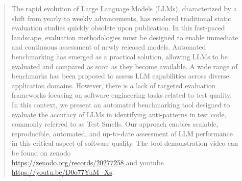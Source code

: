 \documentclass[sigconf]{acmart}
\begin{document}
\begin{abstract}

The rapid evolution of Large Language Models (LLMs), characterized by a shift from yearly to weekly advancements, has rendered traditional static evaluation studies quickly obsolete upon publication. In this fast-paced landscape, evaluation methodologies must be designed to enable immediate and continuous assessment of newly released models. Automated benchmarking has emerged as a practical solution, allowing LLMs to be evaluated and compared as soon as they become available.
A wide range of benchmarks has been proposed to assess LLM capabilities across diverse application domains. However, there is a lack of targeted evaluation frameworks focusing on software engineering tasks related to test quality. In this context, we present an automated benchmarking tool designed to evaluate the accuracy of LLMs in identifying anti-patterns in test code, commonly referred to as Test Smells. Our approach enables scalable, reproducible, automated, and up-to-date assessment of LLM performance in this critical aspect of software quality.
The tool demonstration video can be found on zenodo \\\url{https://zenodo.org/records/20277258} and youtube \url{https://youtu.be/D0o77YuM_Xs}.
\end{abstract}
\end{document}
